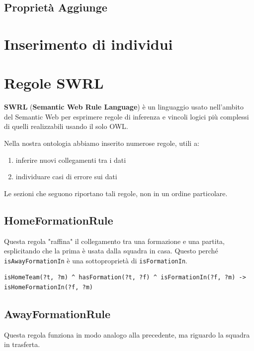 \documentclass[11pt]{report} %
\begin{document}
 \newpage
 \section{Proprietà Aggiunge}

\chapter{Inserimento di individui}

\chapter{Regole SWRL}

\textbf{SWRL} (\textbf{Semantic Web Rule Language}) è un linguaggio usato nell'ambito del Semantic Web per esprimere regole di inferenza e vincoli logici più complessi di quelli realizzabili usando il solo OWL.

\hfill

Nella nostra ontologia abbiamo inserito numerose regole, utili a:

\begin{enumerate}
    \item inferire nuovi collegamenti tra i dati
    \item individuare casi di errore sui dati
\end{enumerate}

Le sezioni che seguono riportano tali regole, non in un ordine particolare.

\section{HomeFormationRule}

Questa regola "raffina" il collegamento tra una formazione e una partita, esplicitando che la prima è usata dalla squadra in casa.
Questo perché \texttt{isAwayFormationIn} è una sottoproprietà di \texttt{isFormationIn}.

\begin{lstlisting}[language=SWRL]
isHomeTeam(?t, ?m) ^ hasFormation(?t, ?f) ^ isFormationIn(?f, ?m) -> isHomeFormationIn(?f, ?m)
\end{lstlisting}

\section{AwayFormationRule}

Questa regola funziona in modo analogo alla precedente, ma riguardo la squadra in trasferta.
\end{document}
